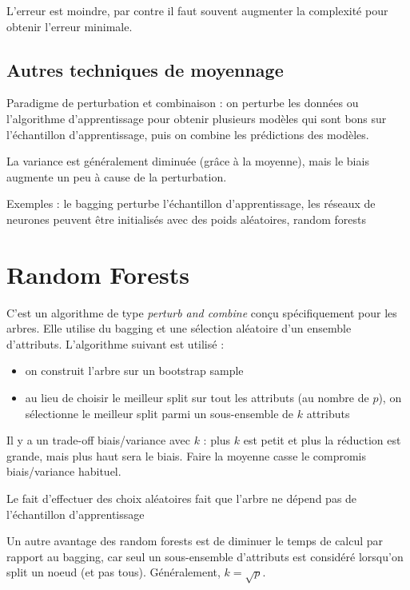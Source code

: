 	L'erreur est moindre, par contre il faut souvent augmenter la complexité pour obtenir l'erreur minimale.
	
	\subsection{Autres techniques de moyennage}
	
	Paradigme de perturbation et combinaison : on perturbe les données ou l'algorithme d'apprentissage pour obtenir plusieurs modèles qui sont bons sur l'échantillon d'apprentissage, puis on combine les prédictions des modèles.
	
	La variance est généralement diminuée (grâce à la moyenne), mais le biais augmente un peu à cause de la perturbation.
	
	Exemples : le bagging perturbe l'échantillon d'apprentissage, les réseaux de neurones peuvent être initialisés avec des poids aléatoires, random forests
	
\section{Random Forests}

	C'est un algorithme de type \textit{perturb and combine} conçu spécifiquement pour les arbres. Elle utilise du bagging et une sélection aléatoire d'un ensemble d'attributs. L'algorithme suivant est utilisé :
	
	\begin{itemize}
		\item on construit l'arbre sur un bootstrap sample
		\item au lieu de choisir le meilleur split sur tout les attributs (au nombre de $p$), on sélectionne le meilleur split parmi un sous-ensemble de $k$ attributs
	\end{itemize}
	
	Il y a un trade-off biais/variance avec $k$ : plus $k$ est petit et plus la réduction est grande, mais plus haut sera le biais. Faire la moyenne casse le compromis biais/variance habituel.
	
	Le fait d'effectuer des choix aléatoires fait que l'arbre ne dépend pas de l'échantillon d'apprentissage
	
	
	Un autre avantage des random forests est de diminuer le temps de calcul par rapport au bagging, car seul un sous-ensemble d'attributs est considéré lorsqu'on split un noeud (et pas tous). Généralement, $k = \sqrt{p}$.
	
